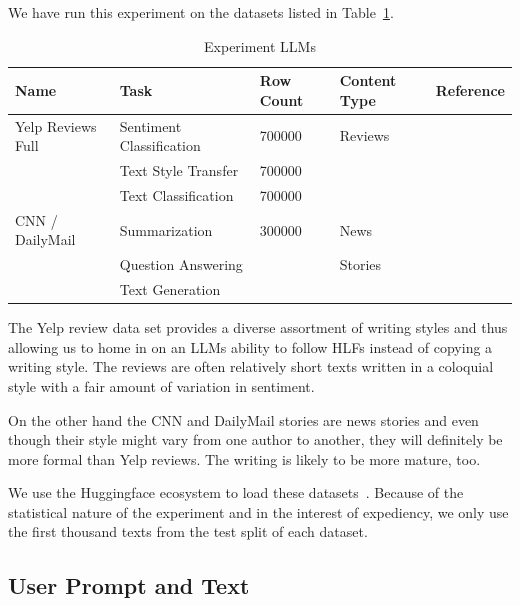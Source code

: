 \documentclass[runningheads,a4paper,11pt]{article}
\begin{document}
We have run this experiment on the datasets listed in Table~\ref{table-ds}.

\begin{table}[ht]
    \setlength\tabcolsep{6pt}
    \centering
    \begin{tabular}{@{}lllll@{}}
        \toprule
        Name              & Task                     & Row Count & Content Type & Reference              \\ \toprule
        Yelp Reviews Full & Sentiment Classification & 700000    & Reviews      & \cite{yelp2015neurips} \\
                          & Text Style Transfer      & 700000    &              &                        \\
                          & Text Classification      & 700000    &              &                        \\ \midrule
        CNN / DailyMail   & Summarization            & 300000    & News         & \cite{cnndm2015}       \\
                          & Question Answering       &           & Stories      & \cite{cnndm2017}       \\
                          & Text Generation          &           &              &                        \\ \midrule
    \end{tabular}
    \caption{Experiment LLMs}\label{table-ds}
\end{table}

The Yelp review data set provides a diverse assortment of writing styles and
thus allowing us to home in on an LLMs ability to follow HLFs instead of copying
a writing style.
The reviews are often relatively short texts written in a coloquial style with
a fair amount of variation in sentiment.

On the other hand the CNN and DailyMail stories are news stories and even though
their style might vary from one author to another, they will definitely be more
formal than Yelp reviews.
The writing is likely to be more mature, too.

We use the Huggingface ecosystem to load these
datasets~\cite{lhoest-etal-2021-datasets}.
Because of the statistical nature of the experiment and in the interest of
expediency, we only use the first thousand texts from the test split of each
dataset.

\subsection{User Prompt and Text}\label{input-text}
\end{document}
